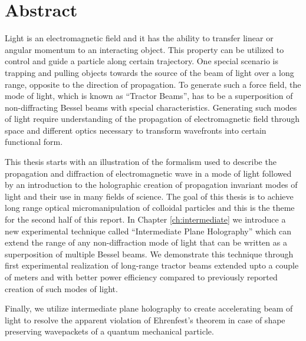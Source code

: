 \chapter*{Abstract}
\label{ch:abstract}


{
\fancyhf{}
}


Light is an electromagnetic field and it has the ability to transfer linear or angular momentum to an interacting object. This property can be utilized to control and guide a particle along certain trajectory. One special scenario is trapping and pulling objects towards the source of the beam of light over a long range, opposite to the direction of propagation. To generate such a force field, the mode of light, which is known as ``Tractor Beams'', has to be a superposition of non-diffracting Bessel beams with special characteristics. Generating such modes of light require understanding of the propagation of electromagnetic field through space and different optics necessary to transform wavefronts into certain functional form.

This thesis starts with an illustration of the formalism used to describe the propagation and diffraction of electromagnetic wave in a mode of light followed by an introduction to the holographic creation of propagation invariant modes of light and their use in many fields of science. The goal of this thesis is to achieve long range optical micromanipulation of colloidal particles and this is the theme for the second half of this report. In Chapter \ref{ch:intermediate} we introduce a new experimental technique called ``Intermediate Plane Holography'' which can extend the range of any non-diffraction mode of light that can be written as a superposition of multiple Bessel beams. We demonstrate this technique through first experimental realization of long-range tractor beams extended upto a couple of meters and with better power efficiency compared to previously reported creation of such modes of light.

Finally, we utilize intermediate plane holography to create accelerating beam of light to resolve the apparent violation of Ehrenfest's theorem in case of shape preserving wavepackets of a quantum mechanical particle.